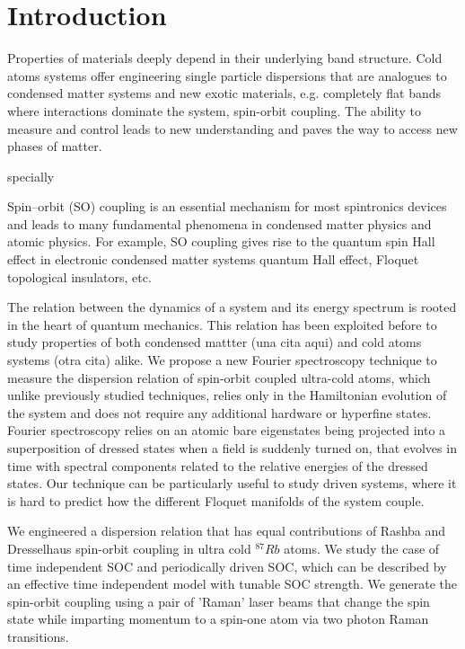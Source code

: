 \section{Introduction}

Properties of materials deeply depend in their underlying band structure. Cold atoms systems offer engineering single particle dispersions that are analogues to condensed matter systems and new exotic materials, e.g. completely flat bands where interactions dominate the system, spin-orbit coupling. The ability to measure and control leads to new understanding and paves the way to access new phases of matter. 

specially 


Spin–orbit (SO) coupling is an essential mechanism for most
spintronics devices and leads to many fundamental phenomena
in condensed matter physics and atomic physics. For example,
SO coupling gives rise to the quantum spin Hall effect in
electronic condensed matter systems
quantum Hall effect, Floquet topological insulators, etc. 


The relation between the dynamics of a system and its energy spectrum is rooted in the heart of quantum mechanics.  This relation has been exploited before to study properties of both condensed mattter (una cita aqui) and cold atoms systems (otra cita) alike. We propose a new Fourier spectroscopy technique to measure the dispersion relation of spin-orbit coupled ultra-cold atoms, which unlike previously studied techniques, relies only in the Hamiltonian evolution of the system and does not require any additional hardware or hyperfine states. Fourier spectroscopy relies on an atomic bare eigenstates being projected into a superposition of dressed states when a field is suddenly turned on, that evolves in time with spectral components related to the relative energies of the dressed states. Our technique can be particularly useful to study driven systems, where it is hard to predict how the different Floquet manifolds of the system couple. 

We engineered a dispersion relation that has equal contributions of Rashba and Dresselhaus spin-orbit coupling in ultra cold $^{87}Rb$ atoms. We study the case of time independent SOC and periodically driven SOC, which can be described by an effective time independent model with tunable SOC strength. We generate the spin-orbit coupling using a pair of 'Raman' laser beams that change the spin state while imparting momentum to a spin-one atom via two photon Raman transitions.  


